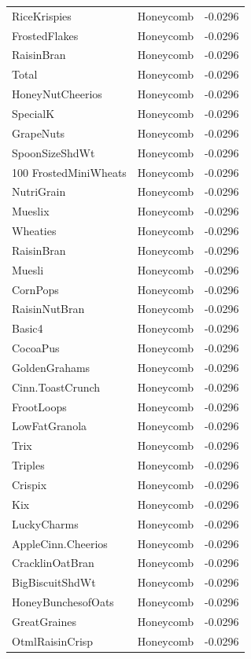 \begin{longtable}{llr}
RiceKrispies & Honeycomb & -0.0296 \\
FrostedFlakes & Honeycomb & -0.0296 \\
RaisinBran & Honeycomb & -0.0296 \\
Total & Honeycomb & -0.0296 \\
HoneyNutCheerios & Honeycomb & -0.0296 \\
SpecialK & Honeycomb & -0.0296 \\
GrapeNuts & Honeycomb & -0.0296 \\
SpoonSizeShdWt & Honeycomb & -0.0296 \\
100%
FrostedMiniWheats & Honeycomb & -0.0296 \\
NutriGrain & Honeycomb & -0.0296 \\
Mueslix & Honeycomb & -0.0296 \\
Wheaties & Honeycomb & -0.0296 \\
RaisinBran & Honeycomb & -0.0296 \\
Muesli & Honeycomb & -0.0296 \\
CornPops & Honeycomb & -0.0296 \\
RaisinNutBran & Honeycomb & -0.0296 \\
Basic4 & Honeycomb & -0.0296 \\
CocoaPus & Honeycomb & -0.0296 \\
GoldenGrahams & Honeycomb & -0.0296 \\
Cinn.ToastCrunch & Honeycomb & -0.0296 \\
FrootLoops & Honeycomb & -0.0296 \\
LowFatGranola & Honeycomb & -0.0296 \\
Trix & Honeycomb & -0.0296 \\
Triples & Honeycomb & -0.0296 \\
Crispix & Honeycomb & -0.0296 \\
Kix & Honeycomb & -0.0296 \\
LuckyCharms & Honeycomb & -0.0296 \\
AppleCinn.Cheerios & Honeycomb & -0.0296 \\
CracklinOatBran & Honeycomb & -0.0296 \\
BigBiscuitShdWt & Honeycomb & -0.0296 \\
HoneyBunchesofOats & Honeycomb & -0.0296 \\
GreatGraines & Honeycomb & -0.0296 \\
OtmlRaisinCrisp & Honeycomb & -0.0296 \\

\end{longtable}
